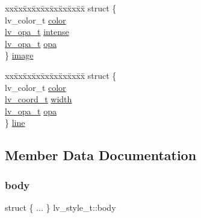 \begin{DoxyCompactItemize}
\begin{tabbing}
\end{tabbing}\item 
\begin{tabbing}
xx\=xx\=xx\=xx\=xx\=xx\=xx\=xx\=xx\=\kill
struct \{\\
\>lv\_color\_t \mbox{\hyperlink{structlv__style__t_a95f8063bcbbb1045f0c38514a234ce39}{color}}\\
\>\mbox{\hyperlink{lv__color_8h_acdb0f6245624d86b1cb002186fd6cf96}{lv\_opa\_t}} \mbox{\hyperlink{structlv__style__t_ab924d111b52976f96634bbb45f789d44}{intense}}\\
\>\mbox{\hyperlink{lv__color_8h_acdb0f6245624d86b1cb002186fd6cf96}{lv\_opa\_t}} \mbox{\hyperlink{structlv__style__t_a2f097b676d0ea5b1c66afb931f3bee09}{opa}}\\
\} \mbox{\hyperlink{structlv__style__t_aded4e38a11475d22b219b83a317628da}{image}}\\

\end{tabbing}\item 
\begin{tabbing}
xx\=xx\=xx\=xx\=xx\=xx\=xx\=xx\=xx\=\kill
struct \{\\
\>lv\_color\_t \mbox{\hyperlink{structlv__style__t_a95f8063bcbbb1045f0c38514a234ce39}{color}}\\
\>\mbox{\hyperlink{lv__area_8h_ad98932f5017f20988532bb68b32a6d76}{lv\_coord\_t}} \mbox{\hyperlink{structlv__style__t_a1d894e253883ac892145735a36828976}{width}}\\
\>\mbox{\hyperlink{lv__color_8h_acdb0f6245624d86b1cb002186fd6cf96}{lv\_opa\_t}} \mbox{\hyperlink{structlv__style__t_a2f097b676d0ea5b1c66afb931f3bee09}{opa}}\\
\} \mbox{\hyperlink{structlv__style__t_af9d426aaa11de96a9a1eb709fd44228e}{line}}\\

\end{tabbing}\end{DoxyCompactItemize}


\subsection{Member Data Documentation}
\mbox{\label{structlv__style__t_a48cfe2d39e4ab926feb1267a90c76ec5}} 
\subsubsection{\texorpdfstring{body}{body}}
{\footnotesize\ttfamily struct \{ ... \}   lv\+\_\+style\+\_\+t\+::body}

